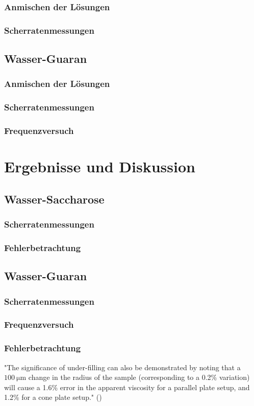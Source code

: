 \documentclass[11pt,a4paper,oneside]{scrartcl}
\begin{document}
\subsubsection{Anmischen der Lösungen}
\subsubsection{Scherratenmessungen}
\subsection{Wasser-Guaran}
\subsubsection{Anmischen der Lösungen}
\subsubsection{Scherratenmessungen}
\subsubsection{Frequenzversuch}
\section{Ergebnisse und Diskussion}
\subsection{Wasser-Saccharose}
\subsubsection{Scherratenmessungen}
\subsubsection{Fehlerbetrachtung}
\subsection{Wasser-Guaran}
\subsubsection{Scherratenmessungen}
\subsubsection{Frequenzversuch}
\subsubsection{Fehlerbetrachtung}
\cite{versuchsanleitung}
\cite{Stadler2014}
\cite{Hellström_2015}
\cite{Arian2021}
"The significance of under-filling can also be demonstrated by
noting that a $100\ \mathrm{\mu m}$ change in the radius of the sample (corresponding to a 0.2\% variation) will cause a 1.6\% error in the
apparent viscosity for a parallel plate setup, and 1.2\% for a
cone plate setup." (\cite{Hellström_2015})
\end{document}
